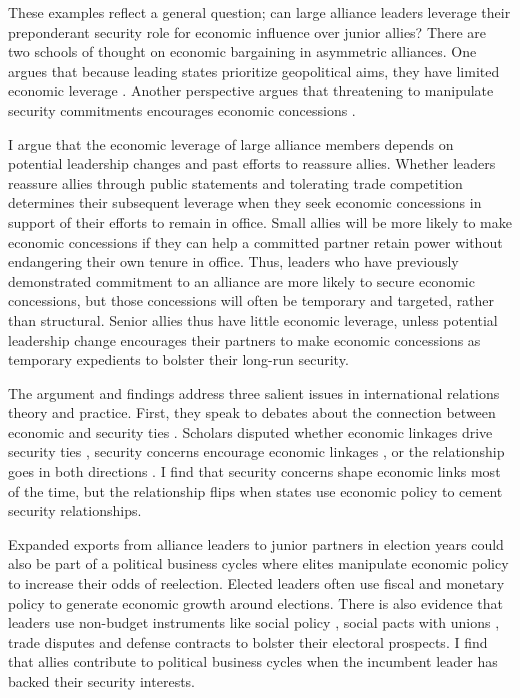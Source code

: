 \documentclass[12pt]{article}
\begin{document}
These examples reflect a general question; can large alliance leaders leverage their preponderant security role for economic influence over junior allies? 
There are two schools of thought on economic bargaining in asymmetric alliances. 
One argues that because leading states prioritize geopolitical aims, they have limited economic leverage \citep{Drezner2013, WolfordKim2017}.
Another perspective argues that threatening to manipulate security commitments encourages economic concessions \citep[pg. 122]{Oatley2015}. 


I argue that the economic leverage of large alliance members depends on potential leadership changes and past efforts to reassure allies.
Whether leaders reassure allies through public statements and tolerating trade competition determines their subsequent leverage when they seek economic concessions in support of their efforts to remain in office. 
Small allies will be more likely to make economic concessions if they can help a committed partner retain power without endangering their own tenure in office.  
Thus, leaders who have previously demonstrated commitment to an alliance are more likely to secure economic concessions, but those concessions will often be temporary and targeted, rather than structural.
Senior allies thus have little economic leverage, unless potential leadership change encourages their partners to make economic concessions as temporary expedients to bolster their long-run security. 




The argument and findings address three salient issues in international relations theory and practice. 
First, they speak to debates about the connection between economic and security ties \citep{Mastanduno2009, Poast2019}. 
Scholars disputed whether economic linkages drive security ties \citep{BiglaiserDeRouen2007, Fordham2010, Kimball2010}, security concerns encourage economic linkages \citep{Gowa1995, Li2003, LongLeeds2006, GowaMansfield2004}, or the relationship goes in both directions \citep{BiglaiserDeRouen2009, KinneBunte2018}. 
I find that security concerns shape economic links most of the time, but the relationship flips when states use economic policy to cement security relationships.


Expanded exports from alliance leaders to junior partners in election years could also be part of a political business cycles where elites manipulate economic policy to increase their odds of reelection. 
Elected leaders often use fiscal \citep{Rogoff1987} and monetary policy \citep{ClarkHallerberg2000} to generate economic growth around elections. 
There is also evidence that leaders use non-budget instruments like social policy \citep{Philips2020}, social pacts with unions \citep{Ahlquist2010}, trade disputes \citep{Conconietal2017} and defense contracts \citep{DerouenHeo2000} to bolster their electoral prospects. 
I find that allies contribute to political business cycles when the incumbent leader has backed their security interests.
\end{document}
